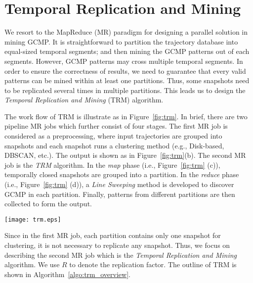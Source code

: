 \section{Temporal Replication and Mining}
\label{sec:trm}
We resort to the MapReduce (MR) paradigm for designing 
a parallel solution in mining GCMP. It is straightforward 
to partition the trajectory database into equal-sized 
temporal segments; and then mining the GCMP patterns out of each segments. However, GCMP
patterns may cross multiple temporal segments. In order to ensure
the correctness of results, we need to guarantee that
every valid patterns can be mined within at least 
one partitions.
Thus, some snapshots need to be 
replicated several times in multiple partitions. This
leads us to design the \emph{Temporal Replication and Mining}
(TRM) algorithm.

The work flow of TRM is illustrate as in Figure~\ref{fig:trm}. 
In brief, there are two pipeline MR jobs which further consist of four stages. 
The first MR job is considered as a preprocessing, where input trajectories
are grouped into snapshots and each snapshot runs a clustering method (e.g., Disk-based, DBSCAN, etc.).
The output is shown as in Figure~\ref{fig:trm}(b). The second
MR job is the \emph{TRM} algorithm. In the \emph{map} phase 
(i.e., Figure~\ref{fig:trm} (c)), temporally closed snapshots are grouped
into a partition. In the \emph{reduce} phase (i.e., Figure~\ref{fig:trm} (d)),
a \emph{Line Sweeping} method is developed to discover GCMP in each partition. Finally,
patterns from different partitions are then collected to form the output.

\begin{figure*} [t]
\center
\texttt{[image: trm.eps]}
\caption{Work flow of Temporal Replication and Mining. (a)(b) correspond to the first MR job which computes the clusters at each snapshot; 
(c)(d) correspond to the second MR job which uses TRM to mine GCMP in parallel.}
\label{fig:trm}
\end{figure*}

Since in the first MR job, each partition contains only one snapshot
for clustering, it is not necessary to replicate any snapshot. Thus, we
focus on describing the second MR job which is the \emph{Temporal
Replication and Mining} algorithm. We use $R$ to denote the replication factor.
The outline of TRM is 
shown in Algorithm~\ref{algo:trm_overview}.

